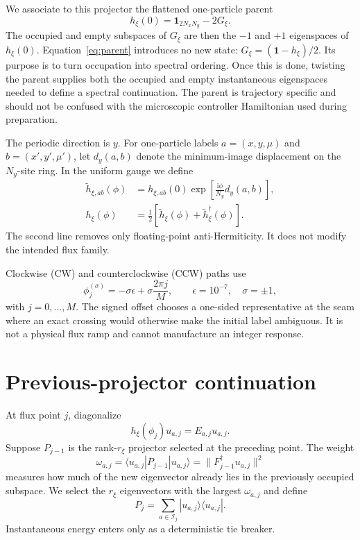 \documentclass[aps,prb,twocolumn,floatfix,nofootinbib,superscriptaddress]{revtex4-2}
\newcommand{\ii}{\mathrm{i}}
\begin{document}
We associate to this projector the flattened one-particle parent
\begin{equation}
 h_\xi(0)=\mathbf{1}_{2N_xN_y}-2G_\xi .
 \label{eq:parent}
\end{equation}
The occupied and empty subspaces of $G_\xi$ are then the $-1$ and $+1$
eigenspaces of $h_\xi(0)$.  Equation~\eqref{eq:parent} introduces no new
state: $G_\xi=(\mathbf{1}-h_\xi)/2$.  Its purpose is to turn occupation into
spectral ordering.  Once this is done, twisting the parent supplies both the
occupied and empty instantaneous eigenspaces needed to define a spectral
continuation.  The parent is trajectory specific and should not be confused
with the microscopic controller Hamiltonian used during preparation.

The periodic direction is $y$.  For one-particle labels
$a=(x,y,\mu)$ and $b=(x',y',\mu')$, let $d_y(a,b)$ denote the minimum-image
displacement on the $N_y$-site ring.  In the uniform gauge we define
\begin{align}
 \widetilde h_{\xi,ab}(\phi)
 &=h_{\xi,ab}(0)
   \exp\!\left[\frac{\ii\phi}{N_y}d_y(a,b)\right],\\
 h_\xi(\phi)&=\frac12\left[\widetilde h_\xi(\phi)
                    +\widetilde h_\xi^\dagger(\phi)\right].
 \label{eq:threaded-parent}
\end{align}
The second line removes only floating-point anti-Hermiticity.  It does not
modify the intended flux family.

Clockwise (CW) and counterclockwise (CCW) paths use
\begin{equation}
 \phi_j^{(\sigma)}=-\sigma\epsilon
 +\sigma\frac{2\pi j}{M},
 \qquad \epsilon=10^{-7},\quad \sigma=\pm1,
 \label{eq:grid}
\end{equation}
with $j=0,\ldots,M$.  The signed offset chooses a one-sided representative at
the seam where an exact crossing would otherwise make the initial label
ambiguous.  It is not a physical flux ramp and cannot manufacture an integer
response.

\section{Previous-projector continuation}

At flux point $j$, diagonalize
\begin{equation}
 h_\xi(\phi_j)u_{a,j}=E_{a,j}u_{a,j}.
\end{equation}
Suppose $P_{j-1}$ is the rank-$r_\xi$ projector selected at the preceding
point.  The weight
\begin{equation}
 \omega_{a,j}
 =\langle u_{a,j}|P_{j-1}|u_{a,j}\rangle
 =\|F_{j-1}^\dagger u_{a,j}\|^2
 \label{eq:weight}
\end{equation}
measures how much of the new eigenvector already lies in the previously
occupied subspace.  We select the $r_\xi$ eigenvectors with the largest
$\omega_{a,j}$ and define
\begin{equation}
 P_j=\sum_{a\in\mathcal I_j}|u_{a,j}\rangle\langle u_{a,j}|.
 \label{eq:selector}
\end{equation}
Instantaneous energy enters only as a deterministic tie breaker.
\end{document}
